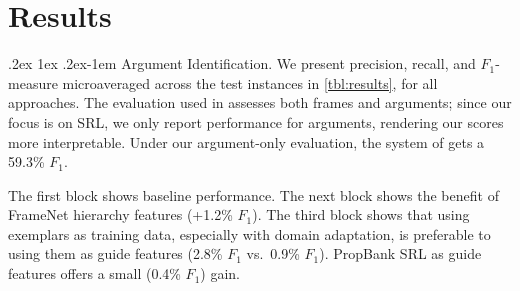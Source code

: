 \documentclass[11pt,a4paper]{article}
\makeatletter
\newcommand{\ensuretext}[1]{#1}
\newcommand{\nssmarker}{\ensuretext{\textcolor{magenta}{\ensuremath{^{\textsc{NS}}_{\textsc{S}}}}}}
\newcommand{\mkmarker}{\ensuretext{\textcolor{red}{\ensuremath{^{\textsc{M}}_{\textsc{K}}}}}}
\newcommand{\arkcomment}[3]{\ensuretext{\textcolor{#3}{[#1 #2]}}}
\newcommand{\nss}[1]{\arkcomment{\nssmarker}{#1}{magenta}}
\newcommand{\mk}[1]{\arkcomment{\mkmarker}{#1}{red}}
\renewcommand{\paragraph}{%
  \@startsection{paragraph}{4}%
  {\z@}{.2ex \@plus 1ex \@minus .2ex}{-1em}%
  {\normalfont\normalsize\bfseries}%
}
\makeatother
\begin{document}
\section{Results}



\paragraph{Argument Identification.}
We present precision, recall, and $F_1$-measure microaveraged across the test
instances in \cref{tbl:results}, for all approaches. %
The evaluation used in \cite{das-14} assesses both frames and arguments;
since our focus is on SRL, we only report performance for arguments, rendering
our scores more interpretable.
Under our argument-only evaluation, the system of \cite{das-14} gets a 59.3\%
$F_1$.

The first block shows baseline performance.
The next block shows the
benefit of FrameNet hierarchy %
features (+1.2\% $F_1$). %
The third block shows
that using exemplars as training data, especially with domain
adaptation, is preferable to using them as guide features (2.8\% $F_1$
vs.~0.9\% $F_1$).  PropBank SRL
as guide features offers a small (0.4\% $F_1$) gain.



\end{document}
